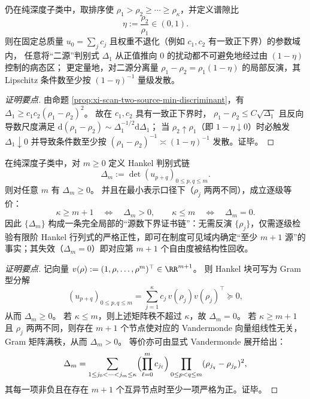 \begin{proposition}\label{prop:xi-scan-two-source-stability-gap}
仍在纯深度子类中，取排序使 \(\rho_1>\rho_2\ge\cdots\ge\rho_\kappa\)，并定义谱隙比
\[
\eta:=\frac{\rho_2}{\rho_1}\in(0,1).
\]
则在固定总质量 \(u_0=\sum_j c_j\) 且权重不退化（例如 \(c_1,c_2\) 有一致正下界）的参数域内，
任意将“二源”判别式 \(\Delta_1\) 从正值推向 \(0\) 的扰动都不可避免地经过由 \((1-\eta)\) 控制的病态区；
更定量地，对二源分离量 \(\rho_1-\rho_2=\rho_1(1-\eta)\) 的局部反演，其 Lipschitz 条件数至少按 \((1-\eta)^{-1}\) 量级发散。
\end{proposition}
\begin{proof}[证明要点]
由命题 \ref{prop:xi-scan-two-source-min-discriminant}，有
\(
\Delta_1\ge c_1c_2(\rho_1-\rho_2)^2
\)。
故在 \(c_1,c_2\) 具有一致正下界时，
\(
\rho_1-\rho_2\le C\sqrt{\Delta_1}
\)
且反向导数尺度满足
\(
\mathrm{d}(\rho_1-\rho_2)\sim \Delta_1^{-1/2}\mathrm{d}\Delta_1
\)；
当 \(\rho_2\uparrow\rho_1\)（即 \(1-\eta\downarrow 0\)）时必触发 \(\Delta_1\downarrow 0\) 并导致条件数至少按 \((\rho_1-\rho_2)^{-1}\asymp (1-\eta)^{-1}\) 发散。证毕。
\end{proof}

\begin{proposition}\label{prop:xi-scan-hankel-determinant-chain-kappa}
在纯深度子类中，对 \(m\ge 0\) 定义 Hankel 判别式链
\[
\Delta_m:=\det(u_{p+q})_{0\le p,q\le m}.
\]
则对任意 \(m\) 有 \(\Delta_m\ge 0\)。
并且在最小表示口径下（\(\rho_j\) 两两不同），成立逐级等价：
\[
\boxed{\;
\kappa\ge m+1\quad\Longleftrightarrow\quad \Delta_m>0,\qquad
\kappa\le m\quad\Longleftrightarrow\quad \Delta_m=0.\;}
\]
因此 \(\{\Delta_m\}\) 构成一条完全局部的“源数下界证书链”：无需反演 \(\{\rho_j\}\)，仅需逐级检验有限阶 Hankel 行列式的严格正性，即可在制度可见域内确定“至少 \(m+1\) 源”的事实；其失效（\(\Delta_m=0\)）即对应第 \(m+1\) 个自由度被结构性回收。
\end{proposition}
\begin{proof}[证明要点]
记向量 \(v(\rho):=(1,\rho,\dots,\rho^{m})^\top\in\RR^{m+1}\)。
则 Hankel 块可写为 Gram 型分解
\[
(u_{p+q})_{0\le p,q\le m}
=\sum_{j=1}^{\kappa}c_j\,v(\rho_j)v(\rho_j)^\top\succeq 0,
\]
从而 \(\Delta_m\ge 0\)。
若 \(\kappa\le m\)，则上述矩阵秩不超过 \(\kappa\)，故 \(\Delta_m=0\)。
若 \(\kappa\ge m+1\) 且 \(\rho_j\) 两两不同，则存在 \(m+1\) 个节点使对应的 Vandermonde 向量组线性无关，Gram 矩阵满秩，从而 \(\Delta_m>0\)。
等价亦可由显式 Vandermonde 展开给出：
\[
\Delta_m=\sum_{1\le j_0<\cdots<j_m\le \kappa}
\Bigl(\prod_{\ell=0}^{m}c_{j_\ell}\Bigr)
\prod_{0\le p<q\le m}(\rho_{j_q}-\rho_{j_p})^2,
\]
其每一项非负且在存在 \(m+1\) 个互异节点时至少一项严格为正。证毕。
\end{proof}

\endinput

